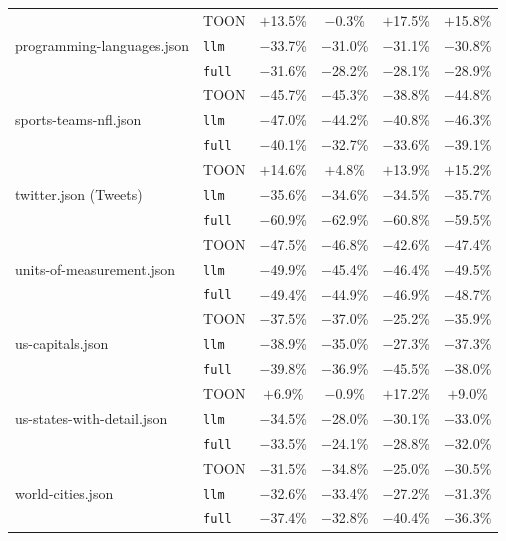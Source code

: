 \begin{table}[t]
\begin{tabular}{@{}llcccc@{}}
    \cline{2-6}
    \multirow{3}{*}{programming-languages.json} & TOON & $+$13.5\% & $-$0.3\% & $+$17.5\% & $+$15.8\% \\
     & \texttt{llm} & $-$33.7\% & $-$31.0\% & $-$31.1\% & $-$30.8\% \\
     & \texttt{full} & $-$31.6\% & $-$28.2\% & $-$28.1\% & $-$28.9\% \\
    \cline{2-6}
    \multirow{3}{*}{sports-teams-nfl.json} & TOON & $-$45.7\% & $-$45.3\% & $-$38.8\% & $-$44.8\% \\
     & \texttt{llm} & $-$47.0\% & $-$44.2\% & $-$40.8\% & $-$46.3\% \\
     & \texttt{full} & $-$40.1\% & $-$32.7\% & $-$33.6\% & $-$39.1\% \\
    \cline{2-6}
    \multirow{3}{*}{twitter.json (Tweets)} & TOON & $+$14.6\% & $+$4.8\% & $+$13.9\% & $+$15.2\% \\
     & \texttt{llm} & $-$35.6\% & $-$34.6\% & $-$34.5\% & $-$35.7\% \\
     & \texttt{full} & $-$60.9\% & $-$62.9\% & $-$60.8\% & $-$59.5\% \\
    \cline{2-6}
    \multirow{3}{*}{units-of-measurement.json} & TOON & $-$47.5\% & $-$46.8\% & $-$42.6\% & $-$47.4\% \\
     & \texttt{llm} & $-$49.9\% & $-$45.4\% & $-$46.4\% & $-$49.5\% \\
     & \texttt{full} & $-$49.4\% & $-$44.9\% & $-$46.9\% & $-$48.7\% \\
    \cline{2-6}
    \multirow{3}{*}{us-capitals.json} & TOON & $-$37.5\% & $-$37.0\% & $-$25.2\% & $-$35.9\% \\
     & \texttt{llm} & $-$38.9\% & $-$35.0\% & $-$27.3\% & $-$37.3\% \\
     & \texttt{full} & $-$39.8\% & $-$36.9\% & $-$45.5\% & $-$38.0\% \\
    \cline{2-6}
    \multirow{3}{*}{us-states-with-detail.json} & TOON & $+$6.9\% & $-$0.9\% & $+$17.2\% & $+$9.0\% \\
     & \texttt{llm} & $-$34.5\% & $-$28.0\% & $-$30.1\% & $-$33.0\% \\
     & \texttt{full} & $-$33.5\% & $-$24.1\% & $-$28.8\% & $-$32.0\% \\
    \cline{2-6}
    \multirow{3}{*}{world-cities.json} & TOON & $-$31.5\% & $-$34.8\% & $-$25.0\% & $-$30.5\% \\
     & \texttt{llm} & $-$32.6\% & $-$33.4\% & $-$27.2\% & $-$31.3\% \\
     & \texttt{full} & $-$37.4\% & $-$32.8\% & $-$40.4\% & $-$36.3\% \\
    \bottomrule
  \end{tabular}
\end{table}

